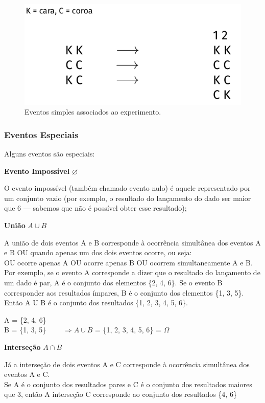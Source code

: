 \documentclass[
]{book}
\theoremstyle{definition}
\theoremstyle{definition}
\theoremstyle{definition}
\theoremstyle{remark}
\begin{document}
\begin{figure}
\includegraphics[width=0.6\linewidth]{img/experimento-aleatorio-moedas} \caption{Eventos simples associados ao experimento.}\label{fig:ch2-experimento-moeda}
\end{figure}

\hypertarget{eventos-especiais}{%
\subsubsection*{Eventos Especiais}\label{eventos-especiais}}

Alguns eventos são especiais:

\textbf{Evento Impossível} \(\varnothing\)

O evento impossível (também chamado evento nulo) é aquele representado por um conjunto vazio (por exemplo, o resultado do lançamento do dado ser maior que 6 --- sabemos que não é possível obter esse resultado);

\textbf{União} \(A \cup B\)

A união de dois eventos A e B corresponde à ocorrência simultânea dos eventos A e B OU quando apenas um dos dois eventos ocorre, ou seja:\\
OU ocorre apenas A OU ocorre apenas B OU ocorrem simultaneamente A e B.\\
Por exemplo, se o evento A corresponde a dizer que o resultado do lançamento de um dado é par, A é o conjunto dos elementos \{2, 4, 6\}. Se o evento B corresponder aos resultados ímpares, B é o conjunto dos elementos \{1, 3, 5\}. Então A U B é o conjunto dos resultados \{1, 2, 3, 4, 5, 6\}.

A = \{2, 4, 6\}\\
B = \{1, 3, 5\} \(\qquad \Rightarrow {A\cup B}\) = \{1, 2, 3, 4, 5, 6\} = \(\Omega\)

\textbf{Interseção} \(A \cap B\)

Já a interseção de dois eventos A e C corresponde à ocorrência simultânea dos eventos A e C.\\
Se A é o conjunto dos resultados pares e C é o conjunto dos resultados maiores que 3, então A interseção C corresponde ao conjunto dos resultados \{4, 6\}
\end{document}
